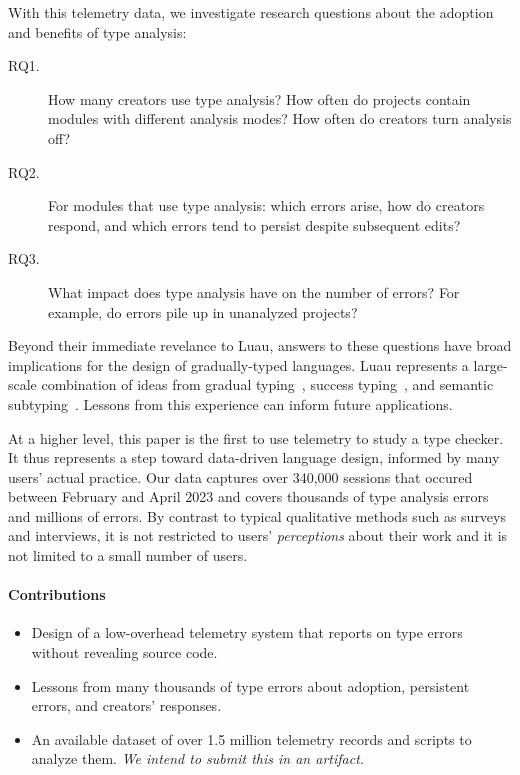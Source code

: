 \documentclass[english,submission,cleveref]{programming}
\begin{document}
With this telemetry data, we investigate research questions about
the adoption and benefits of type analysis: 
\begin{description}
  \item[RQ1.]
    How many creators use type analysis?
    How often do projects contain modules with different
    analysis modes?
    How often do creators turn analysis off?
  \item[RQ2.]
    For modules that use type analysis:
    which errors arise,
    how do creators respond,
    and which errors tend to persist despite subsequent edits?
  \item[RQ3.]
    What impact does type analysis have on the number of \FS{}
    errors?
    For example, do \FS{} errors pile up in unanalyzed projects?
\end{description}

Beyond their immediate revelance to {Luau},
answers to these questions have broad implications for the design
of gradually-typed languages.
Luau represents a large-scale combination of ideas from
gradual typing~\cite{st-sfp-2006,tfffgksst-snapl-2017,bat-ecoop-2014},
success typing~\cite{lindahl2006practical},
and semantic subtyping~\cite{CF05:GentleIntroduction,Jef22:SemanticSubtyping}.
Lessons from this experience can inform future applications.

At a higher level, this paper is the first to use telemetry 
to study a type checker.
It thus represents a step toward data-driven language design,
informed by many users' actual practice.
Our data captures over 340,000 sessions
that occured between February and April 2023
and covers thousands of type analysis errors
and millions of \FS{} errors.
By contrast to typical qualitative methods such as surveys and interviews, it
is not restricted to users' \emph{perceptions} about their work and it is not
limited to a small number of users.


\paragraph{Contributions}
\begin{itemize}
  \item
    Design of a low-overhead telemetry system
    that reports on type errors without revealing source code.

  \item
    Lessons from many thousands of type errors about
    adoption, persistent errors, and creators' responses.

  \item
    An available dataset of over 1.5 million telemetry records
    and scripts to analyze them.
    \emph{We intend to submit this in an artifact.}

\end{itemize}
\end{document}
